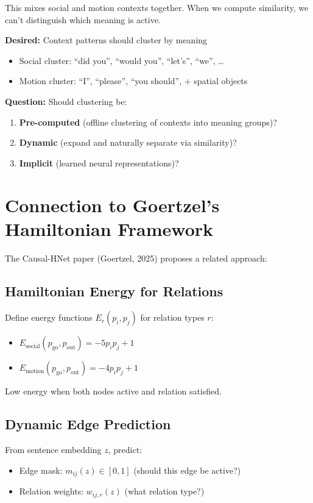 \documentclass[11pt]{article}
\begin{document}
This mixes social and motion contexts together. When we compute similarity, we can't distinguish which meaning is active.

\textbf{Desired:} Context patterns should cluster by meaning
\begin{itemize}
\item Social cluster: ``did you'', ``would you'', ``let's'', ``we'', \ldots
\item Motion cluster: ``I'', ``please'', ``you should'', + spatial objects
\end{itemize}

\textbf{Question:} Should clustering be:
\begin{enumerate}
\item \textbf{Pre-computed} (offline clustering of contexts into meaning groups)?
\item \textbf{Dynamic} (expand and naturally separate via similarity)?
\item \textbf{Implicit} (learned neural representations)?
\end{enumerate}

\section{Connection to Goertzel's Hamiltonian Framework}

The Causal-HNet paper (Goertzel, 2025) proposes a related approach:

\subsection{Hamiltonian Energy for Relations}

Define energy functions $E_r(p_i, p_j)$ for relation types $r$:
\begin{itemize}
\item $E_{\text{social}}(p_{\text{go}}, p_{\text{out}}) = -5 p_i p_j + 1$
\item $E_{\text{motion}}(p_{\text{go}}, p_{\text{out}}) = -4 p_i p_j + 1$
\end{itemize}

Low energy when both nodes active and relation satisfied.

\subsection{Dynamic Edge Prediction}

From sentence embedding $z$, predict:
\begin{itemize}
\item Edge mask: $m_{ij}(z) \in [0,1]$ (should this edge be active?)
\item Relation weights: $w_{ij,r}(z)$ (what relation type?)
\end{itemize}
\end{document}
